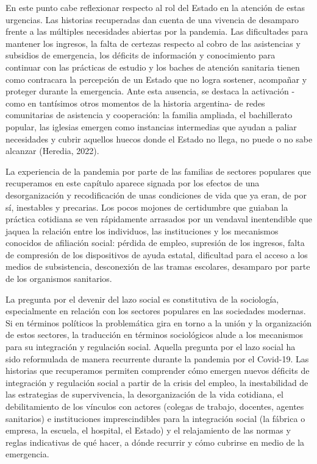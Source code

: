 En este punto cabe reflexionar respecto al rol del Estado en la atención de estas urgencias. Las historias recuperadas dan cuenta de una vivencia de desamparo frente a las múltiples necesidades abiertas por la pandemia. Las dificultades para mantener los ingresos, la falta de certezas respecto al cobro de las asistencias y subsidios de emergencia, los déficits de información y conocimiento para continuar con las prácticas de estudio y los baches de atención sanitaria tienen como contracara la percepción de un Estado que no logra sostener, acompañar y proteger durante la emergencia. Ante esta ausencia, se destaca la activación -como en tantísimos otros momentos de la historia argentina- de redes comunitarias de asistencia y cooperación: la familia ampliada, el bachillerato popular, las iglesias emergen como instancias intermedias que ayudan a paliar necesidades y cubrir aquellos huecos donde el Estado no llega, no puede o no sabe alcanzar (Heredia, 2022).

La experiencia de la pandemia por parte de las familias de sectores populares que recuperamos en este capítulo aparece signada por los efectos de una desorganización y recodificación de unas condiciones de vida que ya eran, de por sí, inestables y precarias. Los pocos mojones de certidumbre que guiaban la práctica cotidiana se ven rápidamente arrasados por un vendaval inentendible que jaquea la relación entre los individuos, las instituciones y los mecanismos conocidos de afiliación social: pérdida de empleo, supresión de los ingresos, falta de compresión de los dispositivos de ayuda estatal, dificultad para el acceso a los medios de subsistencia, desconexión de las tramas escolares, desamparo por parte de los organismos sanitarios.

La pregunta por el devenir del lazo social es constitutiva de la sociología, especialmente en relación con los sectores populares en las sociedades modernas. Si en términos políticos la problemática gira en torno a la unión y la organización de estos sectores, la traducción en términos sociológicos alude a los mecanismos para su integración y regulación social. Aquella pregunta por el lazo social ha sido reformulada de manera recurrente durante la pandemia por el Covid-19. Las historias que recuperamos permiten comprender cómo emergen nuevos déficits de integración y regulación social a partir de la crisis del empleo, la inestabilidad de las estrategias de supervivencia, la desorganización de la vida cotidiana, el debilitamiento de los vínculos con actores (colegas de trabajo, docentes, agentes sanitarios) e instituciones imprescindibles para la integración social (la fábrica o empresa, la escuela, el hospital, el Estado) y el relajamiento de las normas y reglas indicativas de qué hacer, a dónde recurrir y cómo cubrirse en medio de la emergencia.

